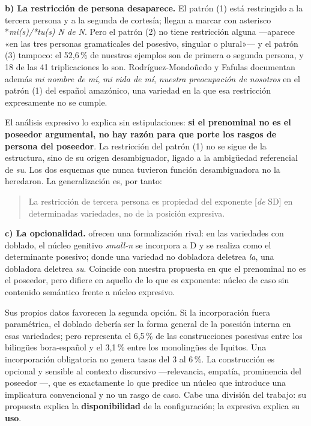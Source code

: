 \documentclass[12pt,a4paper]{article}
\begin{document}
\textbf{b) La restricción de persona desaparece.} El patrón (1) está restringido a la tercera persona y a la segunda de cortesía; \textcite{companycompanyhuertaflores2017} llegan a marcar con asterisco *\textit{mi(s)/*tu(s) N de N}. Pero el patrón (2) no tiene restricción alguna ---aparece «en las tres personas gramaticales del posesivo, singular o plural»--- y el patrón (3) tampoco: el 52,6\,\% de nuestros ejemplos son de primera o segunda persona, y 18 de las 41 triplicaciones lo son. Rodríguez-Mondoñedo y Fafulas documentan además \textit{mi nombre de mí}, \textit{mi vida de mí}, \textit{nuestra preocupación de nosotros} en el patrón (1) del español amazónico, una variedad en la que esa restricción expresamente no se cumple.

El análisis expresivo lo explica sin estipulaciones: \textbf{si el prenominal no es el poseedor argumental, no hay razón para que porte los rasgos de persona del poseedor}. La restricción del patrón (1) no se sigue de la estructura, sino de su origen desambiguador, ligado a la ambigüedad referencial de \textit{su}. Los dos esquemas que nunca tuvieron función desambiguadora no la heredaron. La generalización es, por tanto:

\begin{quote}
La restricción de tercera persona es propiedad del exponente [\textit{de} SD] en determinadas variedades, no de la posición expresiva.
\end{quote}

\textbf{c) La opcionalidad.} \textcite{rodriguezmondonedofafulas2016} ofrecen una formalización rival: en las variedades con doblado, el núcleo genitivo \textit{small-n} se incorpora a D y se realiza como el determinante posesivo; donde una variedad no dobladora deletrea \textit{la}, una dobladora deletrea \textit{su}. Coincide con nuestra propuesta en que el prenominal no es el poseedor, pero difiere en aquello de lo que es exponente: núcleo de caso sin contenido semántico frente a núcleo expresivo.

Sus propios datos favorecen la segunda opción. Si la incorporación fuera paramétrica, el doblado debería ser la forma general de la posesión interna en esas variedades; pero representa el 6,5\,\% de las construcciones posesivas entre los bilingües bora-español y el 3,1\,\% entre los monolingües de Iquitos. Una incorporación obligatoria no genera tasas del 3 al 6\,\%. La construcción es opcional y sensible al contexto discursivo ---relevancia, empatía, prominencia del poseedor \parencite{risco2013}---, que es exactamente lo que predice un núcleo que introduce una implicatura convencional y no un rasgo de caso. Cabe una división del trabajo: su propuesta explica la \textbf{disponibilidad} de la configuración; la expresiva explica su \textbf{uso}.
\end{document}
